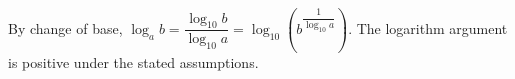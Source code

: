 By change of base, $\log_a b=\dfrac{\log_{10}b}{\log_{10}a}=\boxed{\log_{10}\left(b^{\dfrac{1}{\log_{10}a}}\right)}$. The logarithm argument is positive under the stated assumptions.
